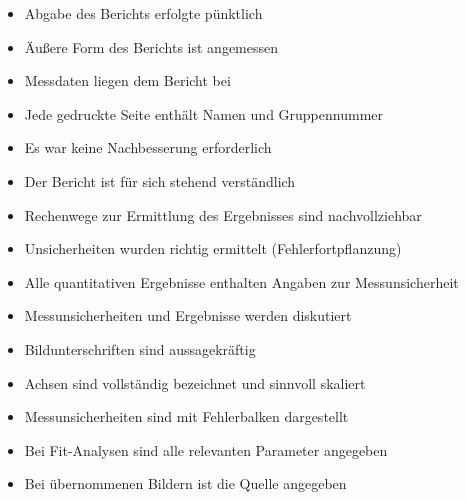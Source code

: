 {\begin{Form}
\begin{tcolorbox}[coltitle=black, colbacktitle=black!10!white
		,title={Allgemeines \hfill \janein }
		,toptitle=1mm
		,width=\linewidth-3mm]
	\begin{itemize}
		\setlength\itemsep{0em}
		\item{Abgabe des Berichts erfolgte pünktlich \kaestchen}
		\item{Äußere Form des Berichts ist angemessen \kaestchen}
		\item{Messdaten liegen dem Bericht bei \kaestchen}
		\item{Jede gedruckte Seite enthält Namen und Gruppennummer \kaestchen}
		\item{Es war keine Nachbesserung erforderlich \kaestchen}
	\end{itemize}
\end{tcolorbox}

\begin{tcolorbox}[coltitle=black, colbacktitle=black!10!white
		,title={Strukturierung und Dokumentation \hfill \janein }
		,toptitle=1mm
		,width=\linewidth-3mm]
	\begin{itemize}
		\setlength\itemsep{0em}
		\item{Der Bericht ist für sich stehend verständlich \hfill \kaestchen}
		\item{Rechenwege zur Ermittlung des Ergebnisses sind nachvollziehbar\hfill \kaestchen}
		\item{Unsicherheiten wurden richtig ermittelt (Fehlerfortpflanzung)\hfill \kaestchen}
		\item{Alle quantitativen Ergebnisse enthalten Angaben zur Messunsicherheit\hfill \kaestchen}
		\item{Messunsicherheiten und Ergebnisse werden diskutiert\hfill \kaestchen}
	\end{itemize}

\end{tcolorbox}
	\begin{tcolorbox}[coltitle=black, colbacktitle=black!10!white
		,title={Graphische Darstellung \hfill \janein }
		,toptitle=1mm
		,width=\linewidth-3mm]
	\begin{itemize}
		\setlength\itemsep{0em}
		\item{Bildunterschriften sind aussagekräftig \hfill \kaestchen}
		\item{Achsen sind vollständig bezeichnet und sinnvoll skaliert \hfill \kaestchen}
		\item{Messunsicherheiten sind mit Fehlerbalken dargestellt \hfill \kaestchen}
		\item{Bei Fit-Analysen sind alle relevanten Parameter angegeben \hfill \kaestchen}
		\item{Bei übernommenen Bildern ist die Quelle angegeben \hfill \kaestchen}
	\end{itemize}
\end{tcolorbox}


\end{Form}}
